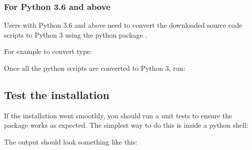 \documentclass[a4paper,11pt,english]{sphinxmanual}
\begin{document}
%
\begin{sphinxVerbatim}[commandchars=\\\{\}]
  
\end{sphinxVerbatim}


\subsubsection{For Python 3.6 and above}
\label{\detokenize{install:for-python-3-6-and-above}}
Users with Python 3.6 and above need to convert the downloaded source code scripts to Python 3 using the python package .

For example to convert  type:

%
\begin{sphinxVerbatim}[commandchars=\\\{\}]
  
\end{sphinxVerbatim}

Once all the python scripts are converted to Python 3, run:

%
\begin{sphinxVerbatim}[commandchars=\\\{\}]
  
\end{sphinxVerbatim}


\subsection{Test the installation}
\label{\detokenize{install:test-the-installation}}
If the installation went smoothly, you should run a unit tests to ensure the package works as expected. The simplest way to do this is inside a python shell:

%
\begin{sphinxVerbatim}[commandchars=\\\{\}]
 
   
\end{sphinxVerbatim}

The output should look something like this:
\end{document}
